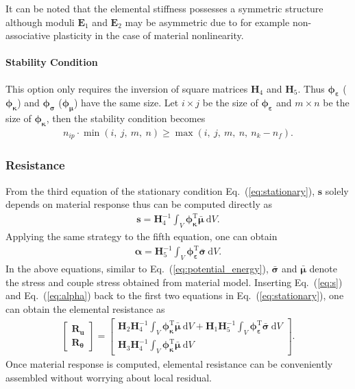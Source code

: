 \documentclass[3p,sort&compress,11pt,fleqn]{elsarticle}
\newcommand*{\eqsref}[1]{Eq.~(\ref{#1})}
\newcommand*{\mT}{\mathrm{T}}
\newcommand*{\md}[1]{\mathrm{d}#1}
\begin{document}
It can be noted that the elemental stiffness possesses a symmetric structure although moduli $\mathbold{E}_1$ and $\mathbold{E}_2$ may be asymmetric due to for example non-associative plasticity in the case of material nonlinearity.
\paragraph{Stability Condition}
This option only requires the inversion of square matrices $\mathbold{H}_4$ and $\mathbold{H}_5$. Thus $\mathbold{\phi}_\mathbold{\varepsilon}$ ($\mathbold{\phi}_\mathbold{\kappa}$) and $\mathbold{\phi}_\mathbold{\sigma}$ ($\mathbold{\phi}_\mathbold{\mu}$) have the same size. Let $i\times{}j$ be the size of $\mathbold{\phi}_\mathbold{\varepsilon}$ and $m\times{}n$ be the size of $\mathbold{\phi}_\mathbold{\kappa}$, then the stability condition becomes
\begin{gather}\label{eq:stability2}
n_{ip}\cdot{}\min\left(i,~j,~m,~n\right)\geqslant{}\max\left(i,~j,~m,~n,~n_k-n_f\right).
\end{gather}
\subsubsection{Resistance}
From the third equation of the stationary condition \eqsref{eq:stationary}, $\mathbold{s}$ solely depends on material response thus can be computed directly as
\begin{gather}\label{eq:s}
\mathbold{s}=\mathbold{H}_4^{-1}\int_V\mathbold{\phi}_\mathbold{\kappa}^\mT{}\bar{\mathbold{\mu}}~\md{V}.
\end{gather}
Applying the same strategy to the fifth equation, one can obtain
\begin{gather}\label{eq:alpha}
\mathbold{\alpha}=\mathbold{H}_5^{-1}\int_V\mathbold{\phi}_\mathbold{\varepsilon}^\mT{}\bar{\mathbold{\sigma}}~\md{V}.
\end{gather}
In the above equations, similar to \eqsref{eq:potential_energy}, $\bar{\mathbold{\sigma}}$ and $\bar{\mathbold{\mu}}$ denote the stress and couple stress obtained from material model. Inserting \eqsref{eq:s} and \eqsref{eq:alpha} back to the first two equations in \eqsref{eq:stationary}, one can obtain the elemental resistance as
\begin{gather}
\begin{bmatrix}
\mathbold{R}_\mathbold{u}\\\mathbold{R}_\mathbold{\theta}
\end{bmatrix}=\begin{bmatrix}
\displaystyle\mathbold{H}_2\mathbold{H}_4^{-1}\int_V\mathbold{\phi}_\mathbold{\kappa}^\mT{}\bar{\mathbold{\mu}}~\md{V}+\mathbold{H}_1\mathbold{H}_5^{-1}\int_V\mathbold{\phi}_\mathbold{\varepsilon}^\mT{}\bar{\mathbold{\sigma}}~\md{V}\\
\displaystyle\mathbold{H}_3\mathbold{H}_4^{-1}\int_V\mathbold{\phi}_\mathbold{\kappa}^\mT{}\bar{\mathbold{\mu}}~\md{V}
\end{bmatrix}.
\end{gather}
Once material response is computed, elemental resistance can be conveniently assembled without worrying about local residual.
\end{document}
